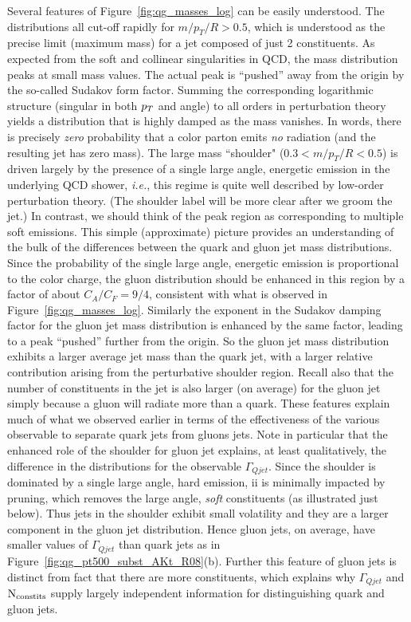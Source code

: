 Several features of Figure~\ref{fig:qg_masses_log} can be easily understood.  The distributions all cut-off rapidly for $m/p_T/R > 0.5$, which is understood as
the precise limit (maximum mass) for a jet composed of just 2 constituents.  As expected from the soft and collinear singularities in QCD, the mass distribution peaks 
at small mass values.  The actual peak is ``pushed'' away from the origin by the so-called Sudakov form factor.  Summing the corresponding logarithmic structure 
(singular in both $p_T$ and angle) to all orders in perturbation theory yields a distribution that is highly damped  as the mass vanishes.  In words, there is precisely 
\textit{zero} probability that a color parton emits \textit{no} radiation (and the resulting jet has zero mass). 
 The large mass ``shoulder" ($0.3 < m/p_T/R < 0.5$) is driven largely by the presence of a single large angle, energetic
emission in the underlying QCD shower, \textit{i.e.}, this regime is quite well described by low-order perturbation theory. 
 (The shoulder label will be more clear after we groom the jet.)
In contrast, we should think of the peak region as corresponding to multiple soft emissions.  This simple (approximate) picture 
provides an understanding of the bulk of the
differences between the quark and gluon jet mass distributions.  Since the probability of the single large angle, energetic emission is proportional to the color charge,
the gluon distribution should be enhanced in this region by a factor of about $C_A/C_F = 9/4$, consistent with what is observed in Figure~\ref{fig:qg_masses_log}.
Similarly the exponent in the Sudakov damping factor for the gluon jet mass distribution  is enhanced by the same factor, 
leading to a peak ``pushed'' further from the origin.  So the gluon jet mass 
distribution exhibits a larger average jet mass than the quark jet, with a larger relative contribution arising from the perturbative shoulder region.  Recall also that
the number of constituents in the jet is also larger (on average) for the gluon jet simply because a gluon will radiate more than a quark.  
These features explain much of what we observed earlier in terms of the effectiveness of the various observable to separate quark jets from gluons jets.
Note in particular that the enhanced role of the shoulder for gluon jet explains, at least qualitatively, the difference in the distributions for the observable 
$\Gamma_{Qjet}$.  Since the shoulder is dominated by a single large angle, hard emission, ii is minimally impacted by pruning,
which removes the large angle, \textit{soft} constituents (as illustrated just below). Thus jets in the shoulder exhibit small volatility and they are a larger
component in the gluon jet distribution.  Hence gluon jets, on average, have smaller values of  $\Gamma_{Qjet}$ than quark jets as in 
Figure~\ref{fig:qg_pt500_subst_AKt_R08}(b).  Further this feature of gluon jets is distinct from fact that there are more constituents, which explains why
$\Gamma_{Qjet}$ and $\rm{N_ {constits}}$ supply largely independent information for distinguishing quark and gluon jets. 

